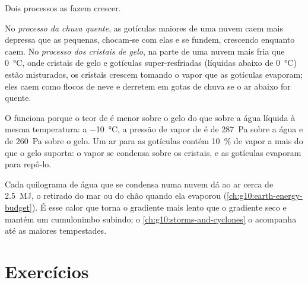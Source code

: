 Dois processos as fazem crescer.

\begin{definition}\label{def:g10:why-clouds-form:rain-processes}
No \emph{processo da chuva quente}, as
gotículas maiores de uma nuvem caem mais depressa que as pequenas, chocam-se
com elas e se fundem, crescendo enquanto caem. No
\emph{processo dos cristais de gelo},
na parte de uma nuvem mais fria que \qty{0}{\degreeCelsius}, onde cristais
de gelo e gotículas super-resfriadas (líquidas abaixo de
\qty{0}{\degreeCelsius}) estão misturados, os cristais crescem tomando o
vapor que as gotículas evaporam; eles caem como flocos de neve e derretem
em gotas de chuva se o ar abaixo for quente.
\end{definition}

O  funciona porque o teor de  é menor
sobre o gelo do que sobre a água líquida à mesma temperatura: a
\qty{-10}{\degreeCelsius}, a pressão de vapor de  é de
\qty{287}{Pa} sobre a água e de \qty{260}{Pa} sobre o gelo. Um ar 
para as gotículas contém \qty{10}{\percent} de vapor a mais do que o gelo
suporta: o vapor se condensa sobre os cristais, e as gotículas evaporam
para repô-lo.

\begin{remark}\label{rem:g10:why-clouds-form:latent}
Cada quilograma de água que se condensa numa nuvem dá ao ar cerca de
\qty{2.5}{MJ}, o  retirado do mar ou do chão quando ela
evaporou (\cref{ch:g10:earth-energy-budget}). É esse calor que torna o
gradiente  mais lento que o gradiente seco e mantém um cumulonimbo
subindo; o \cref{ch:g10:storms-and-cyclones} o acompanha até as maiores
tempestades.
\end{remark}

\section{Exercícios}

